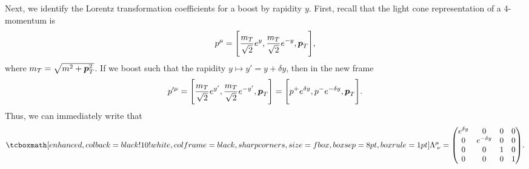 {Next, we identify the Lorentz transformation coefficients for a boost by rapidity $y$.
First, recall that the light cone representation of a 4-momentum is 
\begin{align}
    p^{\mu} = \Bigg[ \frac{m_T}{\sqrt{2}} e^{y}, \frac{m_T}{\sqrt{2}} e^{-y}, \vb*{p}_{T} \Bigg]
,\end{align}
where $m_T = \sqrt{m^2 + \vb*{p}_{T}^2}$.
If we boost such that the rapidity $y \mapsto y' = y + \delta y$, then in the new frame
\begin{align}
    p'^{\mu} = \Bigg[ \frac{m_{T}}{\sqrt{2}} e^{y'}, \frac{m_{T}}{\sqrt{2}} e^{-y'}, \vb*{p}_{T} \Bigg] = \Bigg[ p^{+} e^{\delta y}, p^{-} e^{-\delta y}, \vb*{p}_{T} \Bigg] 
.\end{align}
Thus, we can immediately write that
\begin{align}
\eqbox{
    \Lambda^{\mu}_{\;\nu} = 
    \begin{pmatrix}
        e^{\delta y} & 0 & 0 & 0 \\
        0 & e^{-\delta y} & 0 & 0 \\
        0 & 0 & 1 & 0 \\
        0 & 0 & 0 & 1
    \end{pmatrix}
}
.\end{align}


}



